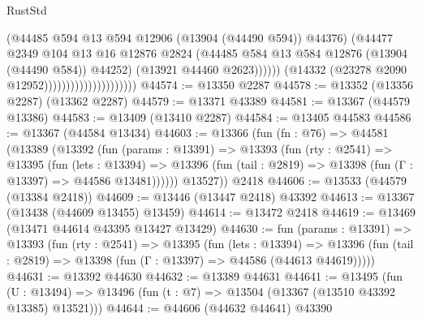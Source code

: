 \begin{lexlean}{RustStd}
\begin{coremodule}
                                                  (@44485
                                                    @594
                                                    @13
                                                    @594
                                                    @12906
                                                    (@13904 (@44490 @594))
                                                    @44376)
                                                  (@44477
                                                    @2349
                                                    @104
                                                    @13
                                                    @16
                                                    @12876
                                                    @2824
                                                    (@44485
                                                      @584
                                                      @13
                                                      @584
                                                      @12876
                                                      (@13904 (@44490 @584))
                                                      @44252)
                                                    (@13921 @44460 @2623))))))
                                          (@14332 (@23278 @2090 @12952)))))))))))))))))))))
@44574 := @13350 @2287
@44578 := @13352 (@13356 @2287) (@13362 @2287)
@44579 := @13371 @43389
@44581 := @13367 (@44579 @13386)
@44583 := @13409 (@13410 @2287)
@44584 := @13405 @44583
@44586 := @13367 (@44584 @13434)
@44603 := @13366
    (fun (fn : @76) =>
    @44581
      (@13389
        (@13392
          (fun (params : @13391) =>
          @13393
            (fun (rty : @2541) =>
            @13395
              (fun (lets : @13394) =>
              @13396 (fun (tail : @2819) => @13398 (fun (Γ : @13397) => @44586 @13481))))))
        @13527))
    @2418
@44606 := @13533 (@44579 (@13384 @2418))
@44609 := @13446 (@13447 @2418) @43392
@44613 := @13367 (@13438 (@44609 @13455) @13459)
@44614 := @13472 @2418
@44619 := @13469 (@13471 @44614 @43395 @13427 @13429)
@44630 := fun (params : @13391) =>
  @13393
    (fun (rty : @2541) =>
    @13395
      (fun (lets : @13394) =>
      @13396 (fun (tail : @2819) => @13398 (fun (Γ : @13397) => @44586 (@44613 @44619)))))
@44631 := @13392 @44630
@44632 := @13389 @44631
@44641 := @13495
    (fun (U : @13494) => @13496 (fun (t : @7) => @13504 (@13367 (@13510 @43392 @13385) @13521)))
@44644 := @44606 (@44632 @44641) @43390

\end{coremodule}
\end{lexlean}
